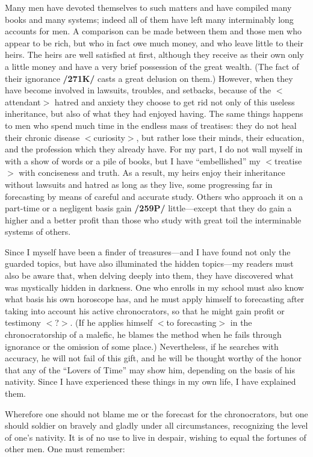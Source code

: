 Many men have devoted themselves to such matters and have compiled many books and many systems; indeed all of them have left many interminably long accounts for men. A comparison can be
made between them and those men who appear to be rich, but who in fact owe much money, and who leave little to their heirs. The heirs are well satisfied at first, although they receive as their own only a little money and have a very brief possession of the great wealth. (The fact of their ignorance \textbf{/271K/} casts a great delusion on them.) However, when they have become involved in lawsuits, troubles, and setbacks, because of the $<$attendant$>$ hatred and anxiety they choose to get rid not only of this useless inheritance,
but also of what they had enjoyed having. The same things happens to men who spend much time in the endless mass of treatises: they do not heal their chronic disease $<$curiosity$>$, but rather lose their minds, their education, and the profession which they already have.
For my part, I do not wall myself in with a show of words or a pile of books, but I have “embellished” my $<$treatise$>$ with conciseness and truth. As a result, my heirs enjoy their inheritance without lawsuits and hatred as long as they live, some progressing far in forecasting by means of careful and accurate study. Others who approach it on a part-time or a negligent basis gain \textbf{/259P/} little—except that
they do gain a higher and a better profit than those who study with great toil the interminable systems of others.

Since I myself have been a finder of treasures—and I have found not only the guarded topics, but have also illuminated the hidden topics—my readers must also be aware that, when delving deeply into them,
they have discovered what was mystically hidden in darkness. One who enrolls in my school must also know what basis his own horoscope has, and he must apply himself to forecasting after taking into account
his active chronocrators, so that he might gain profit or testimony $<$?$>$. (If he applies himself $<$to forecasting$>$ in the chronocratorship of a malefic, he blames the method when he fails through ignorance or the omission of some place.) Nevertheless, if he searches with accuracy, he will not fail of this gift, and he will be thought worthy of the honor that any of the “Lovers of Time” may show him, depending on the basis of his nativity. Since I have experienced these things in my own life, I have explained them.

Wherefore one should not blame me or the forecast for the chronocrators, but one should soldier on bravely and gladly under all circumstances, recognizing the level of one’s nativity. It is of no use to live in despair, wishing to equal the fortunes of other men. One must remember: 

